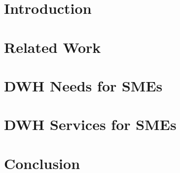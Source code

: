 \documentclass{article}
\begin{document}
\maketitle

\newpage

\begin{abstract}
  
\end{abstract}

\newpage

\tableofcontents

\newpage


\section{Introduction}
\label{sec:introduction}


\newpage

\section{Related Work}
\label{sec:related-work}


\newpage

\section{DWH Needs for SMEs}
\label{sec:dwh-needs-for-smes}


\newpage

\section{DWH Services for SMEs}
\label{sec:dwh-services-for-smes}


\newpage

\section{Conclusion}
\label{sec:conclusion}

\newpage
\printbibliography
\end{document}
